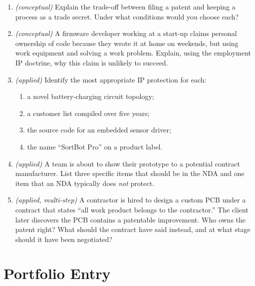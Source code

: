 \begin{enumerate}
  \item \textit{(conceptual)} Explain the trade-off between filing a patent and
        keeping a process as a trade secret.
        Under what conditions would you choose each?

  \item \textit{(conceptual)} A firmware developer working at a start-up claims
        personal ownership of code because they wrote it at home on weekends,
        but using work equipment and solving a work problem.
        Explain, using the employment IP doctrine, why this claim is unlikely
        to succeed.

  \item \textit{(applied)} Identify the most appropriate IP protection for each:
        \begin{enumerate}
          \item[(a)] a novel battery-charging circuit topology;
          \item[(b)] a customer list compiled over five years;
          \item[(c)] the source code for an embedded sensor driver;
          \item[(d)] the name ``SortBot Pro'' on a product label.
        \end{enumerate}

  \item \textit{(applied)} A team is about to show their prototype to a potential
        contract manufacturer.
        List three specific items that should be in the NDA and one item that an
        NDA typically does \emph{not} protect.

  \item \textit{(applied, multi-step)} A contractor is hired to design a custom
        PCB under a contract that states ``all work product belongs to the
        contractor.''
        The client later discovers the PCB contains a patentable improvement.
        Who owns the patent right?
        What should the contract have said instead, and at what stage should it
        have been negotiated?
\end{enumerate}

\section*{Portfolio Entry}
\label{sec:ch15-portfolio}

